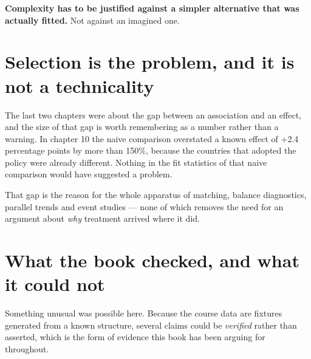 \documentclass[
  letterpaper,
  10pt,
  twoside,
  openright,
  numbers=noenddot,
  chapterprefix=true]{scrbook}
\begin{document}
\textbf{Complexity has to be justified against a simpler alternative
that was actually fitted.} Not against an imagined one.

\section{Selection is the problem, and it is not a
technicality}\label{selection-is-the-problem-and-it-is-not-a-technicality}

The last two chapters were about the gap between an association and an
effect, and the size of that gap is worth remembering as a number rather
than a warning. In chapter 10 the naive comparison overstated a known
effect of +2.4 percentage points by more than 150\%, because the
countries that adopted the policy were already different. Nothing in the
fit statistics of that naive comparison would have suggested a problem.

That gap is the reason for the whole apparatus of matching, balance
diagnostics, parallel trends and event studies --- none of which removes
the need for an argument about \emph{why} treatment arrived where it
did.

\section{What the book checked, and what it could
not}\label{what-the-book-checked-and-what-it-could-not}

Something unusual was possible here. Because the course data are
fixtures generated from a known structure, several claims could be
\emph{verified} rather than asserted, which is the form of evidence this
book has been arguing for throughout.
\end{document}
